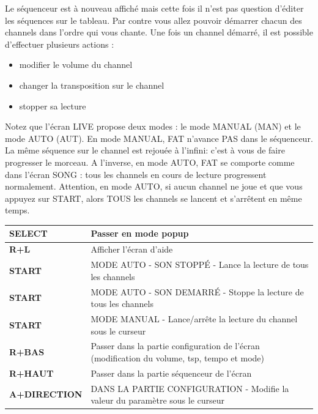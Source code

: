 \documentclass[12pt,a4paper]{article}
\begin{document}
    Le séquenceur est à nouveau affiché mais cette fois il n'est pas question d'éditer les séquences sur le tableau.
    Par contre vous allez pouvoir démarrer chacun des channels dans l'ordre qui vous chante. Une fois un channel démarré, il est possible d'effectuer plusieurs actions :
    \medskip
    \begin{itemize}
        \item{modifier le volume du channel}
        \item{changer la transposition sur le channel}
        \item{stopper sa lecture}
    \end{itemize}
    \medskip
    Notez que l'écran LIVE propose deux modes : le mode MANUAL (MAN) et le mode AUTO (AUT).
    En mode MANUAL, FAT n'avance PAS dans le séquenceur. La même séquence sur le channel est rejouée à l'infini: c'est à vous de faire progresser le morceau.
    A l'inverse, en mode AUTO, FAT se comporte comme dans l'écran SONG : tous les channels en cours de lecture progressent normalement.
    Attention, en mode AUTO, si aucun channel ne joue et que vous appuyez sur START, alors TOUS les channels se lancent et s'arrêtent en même temps.

    \tablelasttail{\hline}
    \begin{supertabular}{|l|p{11cm}|}
    \hline
        {\bf SELECT} & Passer en mode popup \\
        \hline
        {\bf R+L} & Afficher l'écran d'aide \\
        \hline
        {\bf START} & MODE AUTO - SON STOPPÉ - Lance la lecture de tous les channels \\
        \hline
        {\bf START} & MODE AUTO - SON DEMARRÉ - Stoppe la lecture de tous les channels \\
        \hline
        {\bf START} & MODE MANUAL - Lance/arrête la lecture du channel sous le curseur \\
        \hline
        {\bf R+BAS} & Passer dans la partie configuration de l'écran (modification du volume, tsp, tempo et mode) \\
        \hline
        {\bf R+HAUT} & Passer dans la partie séquenceur de l'écran \\
        \hline
        {\bf A+DIRECTION} & DANS LA PARTIE CONFIGURATION - Modifie la valeur du paramètre sous le curseur \\
    \hline
    \end{supertabular}
\end{document}
